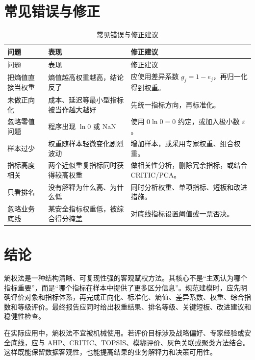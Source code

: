 \documentclass[UTF8,zihao=-4]{ctexart}
\begin{document}
\section{常见错误与修正}

\begin{longtable}{p{3.4cm}p{6.2cm}p{5.2cm}}
\caption{常见错误与修正建议}\\
\toprule
问题 & 表现 & 修正建议 \\
\midrule
\endfirsthead
\toprule
问题 & 表现 & 修正建议 \\
\midrule
\endhead
把熵值直接当权重 & 熵值越高权重越高，结论反了 & 应使用差异系数 $g_j=1-e_j$，再归一化得到权重。 \\
未做正向化 & 成本、延迟等最小型指标被当作越大越好 & 先统一指标方向，再标准化。 \\
忽略零值问题 & 程序出现 $\ln 0$ 或 NaN & 使用 $0\ln0=0$ 约定，或加入极小数 $\varepsilon$。 \\
样本过少 & 权重随样本轻微变化剧烈波动 & 增加样本，或采用专家权重、组合权重。 \\
指标高度相关 & 两个近似重复指标同时获得较高权重 & 做相关性分析，删除冗余指标，或结合 CRITIC/PCA。 \\
只看排名 & 没有解释为什么高、为什么低 & 同时分析权重、单项指标、短板和改进措施。 \\
忽略业务底线 & 某安全指标权重低，被综合得分掩盖 & 对底线指标设置阈值或一票否决。 \\
\bottomrule
\end{longtable}

\section{结论}
熵权法是一种结构清晰、可复现性强的客观赋权方法。其核心不是“主观认为哪个指标重要”，而是“哪个指标在样本中提供了更多区分信息”。规范建模时，应先明确评价对象和指标体系，再完成正向化、标准化、熵值、差异系数、权重、综合指数和等级评价。最终报告应同时给出权重结果、排名等级、关键短板、改进建议和稳健性检查。

在实际应用中，熵权法不宜被机械使用。若评价目标涉及战略偏好、专家经验或安全底线，应与 AHP、CRITIC、TOPSIS、模糊评价、灰色关联或聚类方法结合。这样既能保留数据客观性，也能提高结果的业务解释力和决策可用性。
\end{document}
